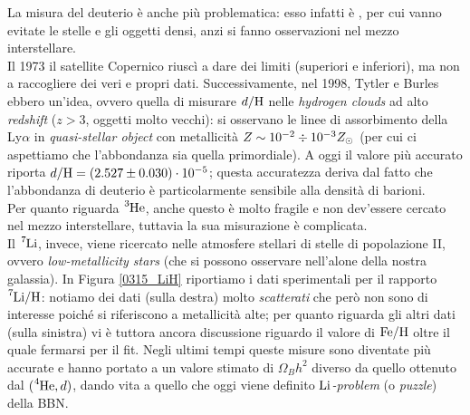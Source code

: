 \noindent La misura del deuterio è anche più problematica: esso infatti è , per cui vanno evitate le stelle e gli oggetti densi, anzi si fanno osservazioni nel mezzo interstellare.\\
Il 1973 il satellite Copernico riuscì a dare dei limiti (superiori e inferiori), ma non a raccogliere dei veri e propri dati. Successivamente, nel 1998, Tytler e Burles ebbero un'idea, ovvero quella di misurare $d/\ce{H}$ nelle \textit{hydrogen clouds} ad alto \textit{redshift} ($z>3$, oggetti molto vecchi): si osservano le linee di assorbimento della Ly$\alpha$ in \textit{quasi-stellar object} con metallicità $Z \sim 10^{-2}\div10^{-3} Z_{\odot}{}$ (per cui ci aspettiamo che l'abbondanza sia quella primordiale). A oggi il valore più accurato riporta $d/\ce{H} = (2.527 \pm 0.030)\cdot\ord{-5}$; questa accuratezza deriva dal fatto che l'abbondanza di deuterio è particolarmente sensibile alla densità di barioni.\\
Per quanto riguarda $\ce{^3He}$, anche questo è molto fragile e non dev'essere cercato nel mezzo interstellare, tuttavia la sua misurazione è complicata.\\
Il $\ce{^7Li}$, invece, viene ricercato nelle atmosfere stellari di stelle di popolazione II, ovvero \textit{low-metallicity stars} (che si possono osservare nell'alone della nostra galassia). In Figura \ref{0315_LiH} riportiamo i dati sperimentali per il rapporto $\ce{^7Li}/\ce{H}$: notiamo dei dati (sulla destra) molto \textit{scatterati} che però non sono di interesse poiché si riferiscono a metallicità alte; per quanto riguarda gli altri dati (sulla sinistra) vi è tuttora ancora discussione riguardo il valore di $\ce{Fe}/\ce{H}$ oltre il quale fermarsi per il fit. Negli ultimi tempi queste misure sono diventate più accurate e hanno portato a un valore stimato di $\Omega_B h^2$ diverso da quello ottenuto dal $(\ce{^4He},d)$, dando vita a quello che oggi viene definito \textit{$\ce{Li}$-problem} (o \textit{puzzle}) della BBN.

